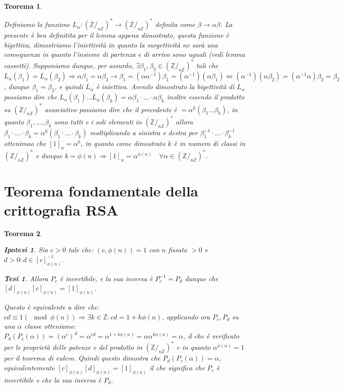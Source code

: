 \documentclass{article}
\makeatletter
\renewenvironment{proof}[1][\proofname]{\par
    \pushQED{\qed}%
    \normalfont \topsep6\p@\@plus6\p@\relax
    \trivlist
    \item\relax
    {\itshape
    #1\@addpunct{.}}\hspace\labelsep\ignorespaces
    }{%
    \popQED\endtrivlist\@endpefalse
}
\newtheorem{theorem}{Teorema}[part]
\newtheorem{ipothesis}[lemma]{Ipotesi}
\newtheorem{thesis}[lemma]{Tesi}
\newcommand{\Z}{\mathbb{Z}}
\makeatother
\begin{document}
\begin{theorem}
    \begin{proof}
        Definiamo la funzione \(L_\alpha:(\Z/_{n\Z})^*\rightarrow(\Z/_{n\Z})^*\) definita come \(\beta\rightarrow\alpha\beta\). La presente è ben definitita per il lemma appena dimostrato, questa funzione è bigettiva, dimostriamo l'iniettività in quanto la surgettività ne sarà una conseguenza in quanto l'insieme di partenza e di arrivo sono uguali (vedi lemma cassetti).
        Supponiamo dunque, per assurdo, \(\exists \beta_1,\beta_2\in (\Z/_{n\Z})^*\) tali che \(L_\alpha(\beta_1)=L_\alpha(\beta_2)\Rightarrow \alpha\beta_1=\alpha\beta_2\rightarrow \beta_1=(\alpha\alpha^{-1})\beta_1=(\alpha^{-1})(\alpha\beta_1)\Leftrightarrow (\alpha^{-1})(\alpha\beta_2)=(\alpha^{-1}\alpha)\beta_2=\beta_2\), dunque \(\beta_1=\beta_2\), e quindi \(L_\alpha\) è iniettiva.
        Avendo dimostrato la bigettività di \(L_\alpha\) possiamo dire che \(L_\alpha(\beta_1)\ldots L_\alpha(\beta_k)=\alpha\beta_1\cdot\ldots\cdot\alpha\beta_k\) inoltre essendo il prodotto su \((\Z/_{n\Z})^*\) associativo possiamo dire che il precedente è \(=\alpha^k(\beta_1\ldots\beta_k)\), in quanto \(\beta_1,\ldots,\beta_k\) sono tutti e i soli elementi in \((\Z/_{n\Z})^*\) allora \(\beta_1\cdot\ldots\cdot\beta_k=\alpha^k(\beta_1\cdot\ldots\cdot\beta_k)\) moltiplicando a sinistra e destra per \(\beta_1^{-1}\cdot\ldots\cdot\beta_k^{-1}\) ottenimao che \([1]_n=\alpha^k\), in quanto come dimostrato \(k\) è in numero di classi in \((\Z/_{n\Z})^*\) e dunque \(k=\phi(n)\Rightarrow [1]_n=\alpha^{\phi(n)}\quad \forall\alpha\in(\Z/_{n\Z})^*\).
        \pushQED{}
    \end{proof}
    \raggedleft{{\ensuremath{\blacksquare}}}
\end{theorem}
\section{Teorema fondamentale della crittografia RSA}
\begin{theorem}
    \begin{ipothesis}
        Sia \(c>0\) tale che: \((c,\phi(n))=1\) con \(n\) fissato \(>0\) e \(d>0: d\in [c]^{-1}_{\phi(n)}\).
    \end{ipothesis}
    \begin{thesis}
        Allora \(P_c\) è invertibile, e la sua inversa è \(P_c^{-1}=P_d\) dunque che \([d]_{\phi(n)}[c]_{\phi(n)}=[1]_{\phi(n)}\).
    \end{thesis}
    \begin{proof}
        Questo è equivalente a dire che: \(cd\equiv 1(\mod \phi(n))\Rightarrow \exists k\in\Z: cd=1+k\phi(n)\), applicando ora \(P_c,P_d\) su una \(\alpha\) classe otteniamo: \(P_d(P_c(\alpha))=(\alpha^c)^d=\alpha^{cd}=\alpha^{1+k\phi(n)}=\alpha\alpha^{k\phi(n)}=\alpha\), il che è verificato per le proprietà delle potenze e del prodotto in \((\Z/_{n\Z})^*\) e in quanto \(\alpha^{\phi(n)}=1\) per il teorema di eulero.
        Quindi questo dimostra che \(P_d(P_c(\alpha))=\alpha\), equivalentemente \([c]_{\phi(n)}[d]_{\phi(n)}=[1]_{\phi(n)}\) il che significa che \(P_c\) è invertibile e che la sua inversa è \(P_d\).
        \pushQED{}
    \end{proof}
    \raggedleft{{\ensuremath{\blacksquare}}}
\end{theorem}
\pagebreak
\end{document}
